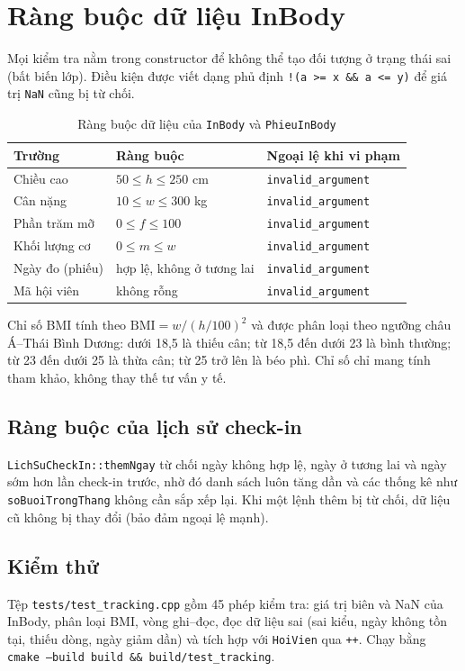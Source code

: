 \section{Ràng buộc dữ liệu InBody}
Mọi kiểm tra nằm trong constructor để không thể tạo đối tượng ở trạng thái sai (bất biến lớp). Điều kiện được viết dạng phủ định \texttt{!(a >= x \&\& a <= y)} để giá trị \texttt{NaN} cũng bị từ chối.
\begin{table}[H]
\centering
\begin{tabular}{@{}lll@{}}
\toprule
\textbf{Trường} & \textbf{Ràng buộc} & \textbf{Ngoại lệ khi vi phạm} \\
\midrule
Chiều cao & $50 \le h \le 250$ cm & \texttt{invalid\_argument} \\
Cân nặng & $10 \le w \le 300$ kg & \texttt{invalid\_argument} \\
Phần trăm mỡ & $0 \le f \le 100$ & \texttt{invalid\_argument} \\
Khối lượng cơ & $0 \le m \le w$ & \texttt{invalid\_argument} \\
Ngày đo (phiếu) & hợp lệ, không ở tương lai & \texttt{invalid\_argument} \\
Mã hội viên & không rỗng & \texttt{invalid\_argument} \\
\bottomrule
\end{tabular}
\caption{Ràng buộc dữ liệu của \texttt{InBody} và \texttt{PhieuInBody}}
\end{table}
Chỉ số BMI tính theo $\mathrm{BMI} = w / (h/100)^2$ và được phân loại theo ngưỡng châu Á--Thái Bình Dương: dưới 18,5 là thiếu cân; từ 18,5 đến dưới 23 là bình thường; từ 23 đến dưới 25 là thừa cân; từ 25 trở lên là béo phì. Chỉ số chỉ mang tính tham khảo, không thay thế tư vấn y tế.

\subsection{Ràng buộc của lịch sử check-in}
\texttt{LichSuCheckIn::themNgay} từ chối ngày không hợp lệ, ngày ở tương lai và ngày sớm hơn lần check-in trước, nhờ đó danh sách luôn tăng dần và các thống kê như \texttt{soBuoiTrongThang} không cần sắp xếp lại. Khi một lệnh thêm bị từ chối, dữ liệu cũ không bị thay đổi (bảo đảm ngoại lệ mạnh).

\subsection{Kiểm thử}
Tệp \texttt{tests/test\_tracking.cpp} gồm 45 phép kiểm tra: giá trị biên và NaN của InBody, phân loại BMI, vòng ghi--đọc, đọc dữ liệu sai (sai kiểu, ngày không tồn tại, thiếu dòng, ngày giảm dần) và tích hợp với \texttt{HoiVien} qua \texttt{++}. Chạy bằng \texttt{cmake --build build \&\& build/test\_tracking}.
